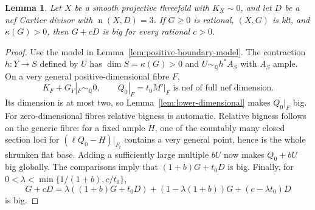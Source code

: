 \documentclass[12pt,a4paper,psamsfonts]{amsart}
\theoremstyle{definition}
\theoremstyle{plain}
\newtheorem{lemma}{Lemma}[section]
\newcommand{\Q}{\mathbb Q}
\newcommand{\nef}{\operatorname{n}}
\begin{document}
\begin{lemma}\label{lem:positive-boundary}
Let $X$ be a smooth projective threefold with $K_X\sim0$,
and let $D$ be a nef Cartier divisor with $\nef(X,D)=3$.
If $G\ge0$ is rational, $(X,G)$ is klt, and $\kappa(G)>0$,
then $G+cD$ is big for every rational $c>0$.
\end{lemma}
\begin{proof}
Use the model in Lemma~\ref{lem:positive-boundary-model}.
The contraction $h:Y\to S$ defined by $U$ has
$\dim S=\kappa(G)>0$ and $U\sim_\Q h^*A_S$ with $A_S$ ample.
On a very general positive-dimensional fibre $F$,
\[
 K_F+G_Y|_F\sim_\Q0,
 \qquad Q_0|_F=t_0M'|_F\text{ is nef of full nef dimension}.
\]
Its dimension is at most two, so Lemma~\ref{lem:lower-dimensional}
makes $Q_0|_F$ big. For zero-dimensional fibres relative bigness
is automatic. Relative bigness follows on the generic fibre: for a fixed ample
$H$, one of the countably many closed section loci for
$(\ell Q_0-H)|_{F_t}$ contains a very general point, hence is the
whole shrunken flat base. Adding a sufficiently large multiple
$bU$ now makes $Q_0+bU$ big globally. The comparisons imply
that $(1+b)G+t_0D$ is big. Finally, for
$0<\lambda<\min\{1/(1+b),c/t_0\}$,
\[
 G+cD=\lambda((1+b)G+t_0D)
 +(1-\lambda(1+b))G+(c-\lambda t_0)D
\]
is big.
\end{proof}
\end{document}
